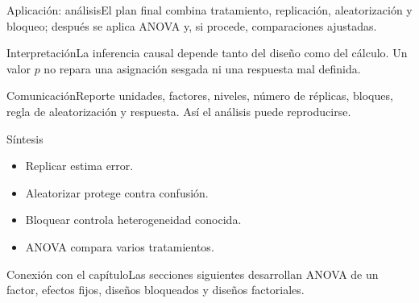 \documentclass[10pt,aspectratio=169]{beamer}
\begin{document}
\begin{frame}{Aplicación: análisis}\small El plan final combina tratamiento, replicación, aleatorización y bloqueo; después se aplica ANOVA y, si procede, comparaciones ajustadas.\end{frame}
\begin{frame}{Interpretación}\small La inferencia causal depende tanto del diseño como del cálculo. Un valor $p$ no repara una asignación sesgada ni una respuesta mal definida.\end{frame}
\begin{frame}{Comunicación}\small Reporte unidades, factores, niveles, número de réplicas, bloques, regla de aleatorización y respuesta. Así el análisis puede reproducirse.\end{frame}
\begin{frame}{Síntesis}\small\begin{itemize}\item Replicar estima error.\item Aleatorizar protege contra confusión.\item Bloquear controla heterogeneidad conocida.\item ANOVA compara varios tratamientos.\end{itemize}\end{frame}
\begin{frame}{Conexión con el capítulo}\small Las secciones siguientes desarrollan ANOVA de un factor, efectos fijos, diseños bloqueados y diseños factoriales.\end{frame}
\end{document}
